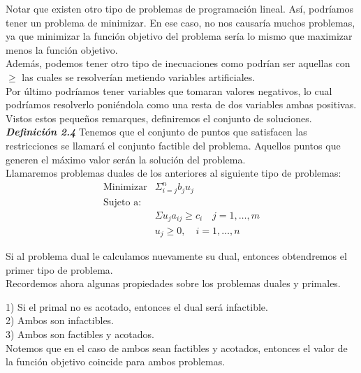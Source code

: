 \documentclass[10pt,a4paper]{book}
\begin{document}
Notar que existen otro tipo de problemas de programación lineal. Así, podríamos tener un problema de minimizar. En ese caso, no nos causaría muchos problemas, ya que minimizar la función objetivo del problema sería lo mismo que maximizar menos la función objetivo.\\

Además, podemos tener otro tipo de inecuaciones como podrían ser aquellas con $\geq$ las cuales se resolverían metiendo variables artificiales.\\
Por último podríamos tener variables que tomaran valores negativos, lo cual podríamos resolverlo poniéndola como una resta de dos variables ambas positivas.\\

Vistos estos pequeños remarques, definiremos el conjunto de soluciones.\\

\textit{\textbf{Definición 2.4}} Tenemos que el conjunto de puntos que satisfacen las restricciones se llamará el conjunto factible del problema. Aquellos puntos que generen el máximo valor serán la solución del problema.\\

Llamaremos problemas duales de los anteriores al siguiente tipo de problemas:\\



$$\begin{array}{lc}
\mbox{Minimizar} & \Sigma^n_{i=j} b_ju_j\\
\mbox{Sujeto a:}  \\
&  \Sigma u_ja_{ij} \geq c_i \quad j=1,\ldots, m\\
&u_j \geq 0, \quad i=1, \ldots ,n
\end{array}$$


Si al problema dual le calculamos nuevamente su dual, entonces obtendremos el primer tipo de problema.\\

Recordemos ahora algunas propiedades sobre los problemas duales y primales.

1) Si el primal no es acotado, entonces el dual será infactible.\\
2) Ambos son infactibles.\\
3) Ambos son factibles y acotados.\\

Notemos que en el caso de ambos sean factibles y acotados, entonces el valor de la función objetivo coincide para ambos problemas.\\
\end{document}
